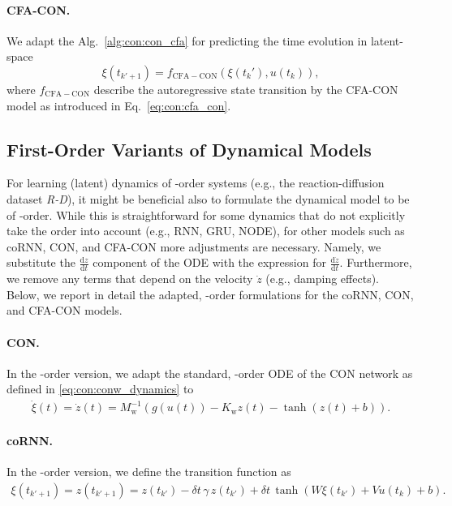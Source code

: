 \paragraph{CFA-CON.} We adapt the Alg.~\ref{alg:con:con_cfa} for predicting the time evolution in latent-space
\begin{equation}
    \xi(t_{k'+1}) = f_\mathrm{CFA-CON}(\xi(t_k'), u(t_k)),
\end{equation}
where $f_\mathrm{CFA-CON}$ describe the autoregressive state transition by the \gls{CFA-CON} model as introduced in Eq.~\ref{eq:con:cfa_con}.

\subsection{First-Order Variants of Dynamical Models}\label{sub:apx-con:1st_order_latent_dynamics}
For learning (latent) dynamics of -order systems (e.g., the reaction-diffusion dataset \emph{R-D}), it might be beneficial also to formulate the dynamical model to be of -order. 
While this is straightforward for some dynamics that do not explicitly take the order into account (e.g., RNN, GRU, NODE), for other models such as \gls{coRNN}, \gls{CON}, and \gls{CFA-CON} more adjustments are necessary.
Namely, we substitute the $\frac{\mathrm{d} z}{\mathrm{d}t}$ component of the \gls{ODE} with the expression for $\frac{\mathrm{d} \dot{z}}{\mathrm{d}t}$. Furthermore, we remove any terms that depend on the velocity $\dot{z}$ (e.g., damping effects).
Below, we report in detail the adapted, -order formulations for the \gls{coRNN}, \gls{CON}, and \gls{CFA-CON} models.

\paragraph{CON.} In the -order version, we adapt the standard, -order \gls{ODE} of the \gls{CON} network as defined in \eqref{eq:con:conw_dynamics} to
\begin{equation}
\begin{split}
    \dot{\xi}(t) = \dot{z}(t) = M_\mathrm{w}^{-1} \left ( g(u(t)) - K_\mathrm{w} z(t) - \tanh(z(t) + b) \right ).
\end{split}
\end{equation}

\paragraph{coRNN.} In the -order version, we define the transition function as
\begin{equation}
\begin{split}
    \xi(t_{k'+1}) = z(t_{k'+1}) = z(t_{k'}) - \delta t \, \gamma \, z(t_{k'}) + \delta t \, \tanh \left ( W \xi(t_{k'}) + V u(t_k) + b \right ).
\end{split}
\end{equation}

